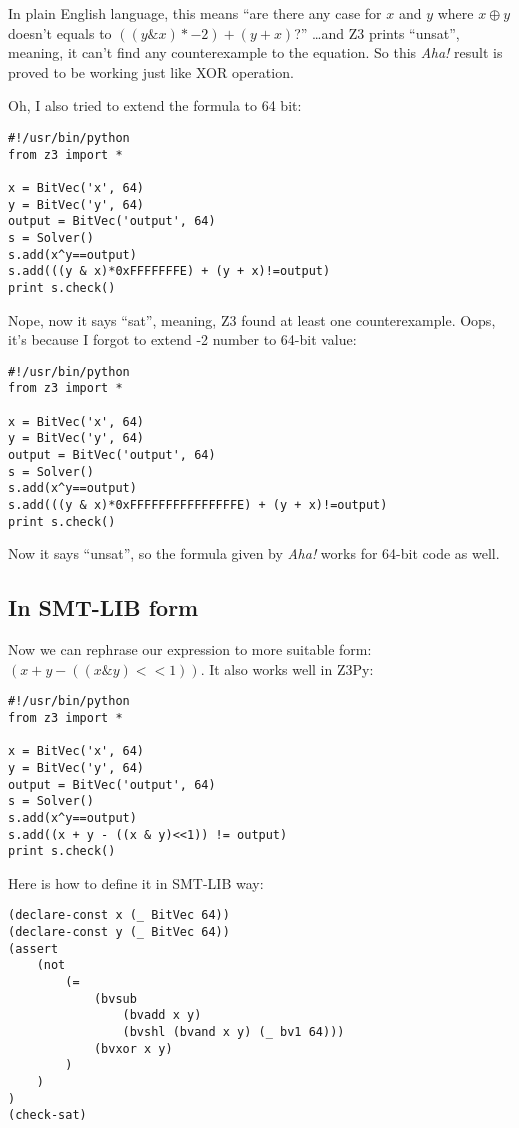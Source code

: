 In plain English language, this means
``are there any case for $x$ and $y$ where $x \oplus y$ doesn't equals to $((y \& x)*-2) + (y + x)$?''
\dots and Z3 prints ``unsat'', meaning, it can't find any counterexample to the equation.
So this \textit{Aha!} result is proved to be working just like XOR operation.

Oh, I also tried to extend the formula to 64 bit:

\begin{lstlisting}
#!/usr/bin/python
from z3 import *

x = BitVec('x', 64)
y = BitVec('y', 64)
output = BitVec('output', 64)
s = Solver()
s.add(x^y==output)
s.add(((y & x)*0xFFFFFFFE) + (y + x)!=output)
print s.check()
\end{lstlisting}

Nope, now it says ``sat'', meaning, Z3 found at least one counterexample.
Oops, it's because I forgot to extend -2 number to 64-bit value:

\begin{lstlisting}
#!/usr/bin/python
from z3 import *

x = BitVec('x', 64)
y = BitVec('y', 64)
output = BitVec('output', 64)
s = Solver()
s.add(x^y==output)
s.add(((y & x)*0xFFFFFFFFFFFFFFFE) + (y + x)!=output)
print s.check()
\end{lstlisting}

Now it says ``unsat'', so the formula given by \textit{Aha!} works for 64-bit code as well.

\subsection{In SMT-LIB form}

Now we can rephrase our expression to more suitable form: $(x + y - ((x \& y)<<1))$.
It also works well in Z3Py:

\begin{lstlisting}
#!/usr/bin/python
from z3 import *

x = BitVec('x', 64)
y = BitVec('y', 64)
output = BitVec('output', 64)
s = Solver()
s.add(x^y==output)
s.add((x + y - ((x & y)<<1)) != output)
print s.check()
\end{lstlisting}

Here is how to define it in SMT-LIB way:

\begin{lstlisting}
(declare-const x (_ BitVec 64))
(declare-const y (_ BitVec 64))
(assert 
	(not
		(=
			(bvsub
				(bvadd x y)
				(bvshl (bvand x y) (_ bv1 64)))
			(bvxor x y)
		)
	)
)
(check-sat)
\end{lstlisting}

